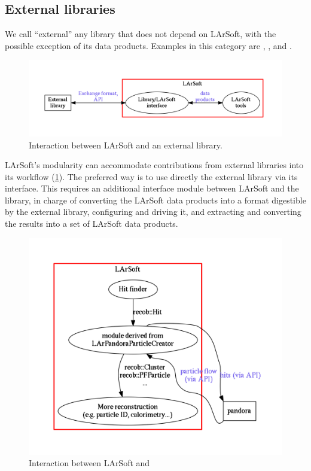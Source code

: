 \subsection{External libraries}\label{external-libraries}

We call ``external'' any library that does not depend on LArSoft, with
the possible exception of its data products. Examples in this category
are \GENIE, \GEANT, and \Pandora.

\begin{figure}
   \centering
   \includegraphics[width=\textwidth]{figures/LArSoftAndExternals.pdf}
   \caption{\label{fig:LArSoftAndExternals}
      Interaction between LArSoft and an external library.
   }
\end{figure}

LArSoft's modularity can accommodate contributions from external
libraries into its workflow (\cref{fig:LArSoftAndExternals}). The
preferred way is to use directly the external library via its interface.
This requires an additional interface module between LArSoft and the
library, in charge of converting the LArSoft data products into a format
digestible by the external library, configuring and driving it, and
extracting and converting the results into a set of LArSoft data
products.

\begin{figure}
   \centering
   \includegraphics[width=\textwidth]{figures/LArSoftAndPandora.pdf}
   \caption{\label{fig:LArSoftAndPandora}
      Interaction between LArSoft and \Pandora
   }
\end{figure}

